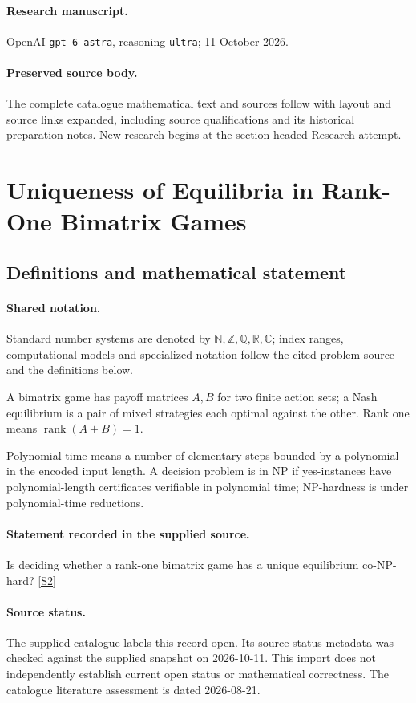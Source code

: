 \documentclass[11pt]{article}
\begin{document}
\paragraph{Research manuscript.} OpenAI \texttt{gpt-6-astra}, reasoning \texttt{ultra}; 11 October 2026.
\paragraph{Preserved source body.} The complete catalogue mathematical text and sources follow with layout and source links expanded, including source qualifications and its historical preparation notes. New research begins at the section headed Research attempt.

\section{Uniqueness of Equilibria in Rank-One Bimatrix Games}\label{statement}

\subsection{Definitions and mathematical statement}

\paragraph{Shared notation.}Standard number systems are denoted by $\mathbb N,\mathbb Z,\mathbb Q,\mathbb R,\mathbb C$; index ranges, computational models and specialized notation follow the cited problem source and the definitions below.


A bimatrix game has payoff matrices $A,B$ for two finite action sets; a Nash equilibrium is a pair of mixed strategies each optimal against the other. Rank one means $\operatorname{rank}(A+B)=1$.

Polynomial time means a number of elementary steps bounded by a polynomial in the encoded input length. A decision problem is in $\mathrm{NP}$ if yes-instances have polynomial-length certificates verifiable in polynomial time; NP-hardness is under polynomial-time reductions.
\paragraph{Statement recorded in the supplied source.}
Is deciding whether a rank-one bimatrix game has a unique equilibrium co-NP-hard? \href{https://doi.org/10.4171/owr/2018/38}{[S2]}
\paragraph{Source status.}
The supplied catalogue labels this record open. Its source-status metadata was checked against the supplied snapshot on 2026-10-11. This import does not independently establish current open status or mathematical correctness. The catalogue literature assessment is dated 2026-08-21.
\end{document}
